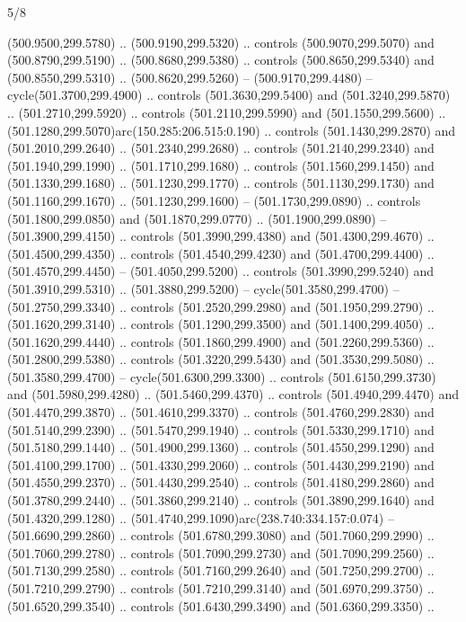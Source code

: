 \begin{flagdescription}{5/8}
\begin{scope}[xshift=0.5\flaglength,yshift=0.5\flagwidth,scale=\flagwidth/475.63]
\begin{scope}[y=0.8pt, x=0.8pt, yscale=-1, xscale=1,shift={(-450,-300)}]
\begin{scope}[cm={{1.0,0.0,0.0,1.0,(-0.0002,0.12556)}},cm={{1.0,0.0,0.0,1.0,(0.00179,0.0)}}]
\begin{scope}[cm={{1.11592,0.0,0.0,1.11592,(-106.89933,-41.77764)}}]
\begin{scope}[draw=black,fill=cfff]
\begin{scope}[fill=black]
  (500.9500,299.5780) .. (500.9190,299.5320) .. controls (500.9070,299.5070) and
  (500.8790,299.5190) .. (500.8680,299.5380) .. controls (500.8650,299.5340) and
  (500.8550,299.5310) .. (500.8620,299.5260) -- (500.9170,299.4480) --
  cycle(501.3700,299.4900) .. controls (501.3630,299.5400) and
  (501.3240,299.5870) .. (501.2710,299.5920) .. controls (501.2110,299.5990) and
  (501.1550,299.5600) .. (501.1280,299.5070)arc(150.285:206.515:0.190) ..
  controls (501.1430,299.2870) and (501.2010,299.2640) .. (501.2340,299.2680) ..
  controls (501.2140,299.2340) and (501.1940,299.1990) .. (501.1710,299.1680) ..
  controls (501.1560,299.1450) and (501.1330,299.1680) .. (501.1230,299.1770) ..
  controls (501.1130,299.1730) and (501.1160,299.1670) .. (501.1230,299.1600) --
  (501.1730,299.0890) .. controls (501.1800,299.0850) and (501.1870,299.0770) ..
  (501.1900,299.0890) -- (501.3900,299.4150) .. controls (501.3990,299.4380) and
  (501.4300,299.4670) .. (501.4500,299.4350) .. controls (501.4540,299.4230) and
  (501.4700,299.4400) .. (501.4570,299.4450) -- (501.4050,299.5200) .. controls
  (501.3990,299.5240) and (501.3910,299.5310) .. (501.3880,299.5200) --
  cycle(501.3580,299.4700) -- (501.2750,299.3340) .. controls
  (501.2520,299.2980) and (501.1950,299.2790) .. (501.1620,299.3140) .. controls
  (501.1290,299.3500) and (501.1400,299.4050) .. (501.1620,299.4440) .. controls
  (501.1860,299.4900) and (501.2260,299.5360) .. (501.2800,299.5380) .. controls
  (501.3220,299.5430) and (501.3530,299.5080) .. (501.3580,299.4700) --
  cycle(501.6300,299.3300) .. controls (501.6150,299.3730) and
  (501.5980,299.4280) .. (501.5460,299.4370) .. controls (501.4940,299.4470) and
  (501.4470,299.3870) .. (501.4610,299.3370) .. controls (501.4760,299.2830) and
  (501.5140,299.2390) .. (501.5470,299.1940) .. controls (501.5330,299.1710) and
  (501.5180,299.1440) .. (501.4900,299.1360) .. controls (501.4550,299.1290) and
  (501.4100,299.1700) .. (501.4330,299.2060) .. controls (501.4430,299.2190) and
  (501.4550,299.2370) .. (501.4430,299.2540) .. controls (501.4180,299.2860) and
  (501.3780,299.2440) .. (501.3860,299.2140) .. controls (501.3890,299.1640) and
  (501.4320,299.1280) .. (501.4740,299.1090)arc(238.740:334.157:0.074) --
  (501.6690,299.2860) .. controls (501.6780,299.3080) and (501.7060,299.2990) ..
  (501.7060,299.2780) .. controls (501.7090,299.2730) and (501.7090,299.2560) ..
  (501.7130,299.2580) .. controls (501.7160,299.2640) and (501.7250,299.2700) ..
  (501.7210,299.2790) .. controls (501.7210,299.3140) and (501.6970,299.3750) ..
  (501.6520,299.3540) .. controls (501.6430,299.3490) and (501.6360,299.3350) ..

\end{scope}
\end{scope}
\end{scope}
\end{scope}
\end{scope}
\end{scope}
\end{flagdescription}
